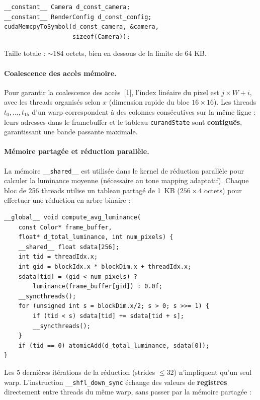 \documentclass[12pt,a4paper]{article}
\begin{document}
\begin{lstlisting}[caption={Utilisation de la m\'{e}moire constante}]
__constant__ Camera d_const_camera;
__constant__ RenderConfig d_const_config;
cudaMemcpyToSymbol(d_const_camera, &camera,
                   sizeof(Camera));
\end{lstlisting}

Taille totale : $\sim$184 octets, bien en dessous de la limite de 64 KB.

\paragraph{Coalescence des acc\`{e}s m\'{e}moire.}
Pour garantir la coalescence des acc\`{e}s~[1], l'index lin\'{e}aire du pixel est $j \times W + i$, avec les threads organis\'{e}s selon $x$ (dimension rapide du bloc $16\times16$). Les threads $t_0, \ldots, t_{15}$ d'un warp correspondent \`{a} des colonnes cons\'{e}cutives sur la m\^{e}me ligne : leurs adresses dans le framebuffer et le tableau \texttt{curandState} sont \textbf{contigu\"{e}s}, garantissant une bande passante maximale.

\paragraph{M\'{e}moire partag\'{e}e et r\'{e}duction parall\`{e}le.}
La m\'{e}moire \texttt{\_\_shared\_\_} est utilis\'{e}e dans le kernel de r\'{e}duction parall\`{e}le pour calculer la luminance moyenne (n\'{e}cessaire au tone mapping adaptatif). Chaque bloc de 256 threads utilise un tableau partag\'{e} de 1~KB ($256 \times 4$ octets) pour effectuer une r\'{e}duction en arbre binaire :

\begin{lstlisting}[caption={Kernel de r\'{e}duction parall\`{e}le}]
__global__ void compute_avg_luminance(
    const Color* frame_buffer,
    float* d_total_luminance, int num_pixels) {
    __shared__ float sdata[256];
    int tid = threadIdx.x;
    int gid = blockIdx.x * blockDim.x + threadIdx.x;
    sdata[tid] = (gid < num_pixels) ?
        luminance(frame_buffer[gid]) : 0.0f;
    __syncthreads();
    for (unsigned int s = blockDim.x/2; s > 0; s >>= 1) {
        if (tid < s) sdata[tid] += sdata[tid + s];
        __syncthreads();
    }
    if (tid == 0) atomicAdd(d_total_luminance, sdata[0]);
}
\end{lstlisting}

Les 5 derni\`{e}res it\'{e}rations de la r\'{e}duction (strides $\leq 32$) n'impliquent qu'un seul warp. L'instruction \texttt{\_\_shfl\_down\_sync} \'{e}change des valeurs de \textbf{registres} directement entre threads du m\^{e}me warp, sans passer par la m\'{e}moire partag\'{e}e :
\end{document}
